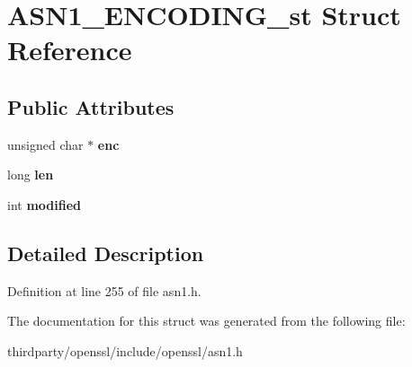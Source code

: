 \hypertarget{struct_a_s_n1___e_n_c_o_d_i_n_g__st}{}\section{A\+S\+N1\+\_\+\+E\+N\+C\+O\+D\+I\+N\+G\+\_\+st Struct Reference}
\label{struct_a_s_n1___e_n_c_o_d_i_n_g__st}
\subsection*{Public Attributes}
\begin{DoxyCompactItemize}
\item 
\mbox{\label{struct_a_s_n1___e_n_c_o_d_i_n_g__st_afa11cb714645d40f5602574e57ac8cb9}} 
unsigned char $\ast$ {\bfseries enc}
\item 
\mbox{\label{struct_a_s_n1___e_n_c_o_d_i_n_g__st_a1d4db56d95977ef9daad570912a187cc}} 
long {\bfseries len}
\item 
\mbox{\label{struct_a_s_n1___e_n_c_o_d_i_n_g__st_a81a85e0aa68d4a31fe277f88d7f1fdd5}} 
int {\bfseries modified}
\end{DoxyCompactItemize}


\subsection{Detailed Description}


Definition at line 255 of file asn1.\+h.



The documentation for this struct was generated from the following file\+:\begin{DoxyCompactItemize}
\item 
thirdparty/openssl/include/openssl/asn1.\+h\end{DoxyCompactItemize}
